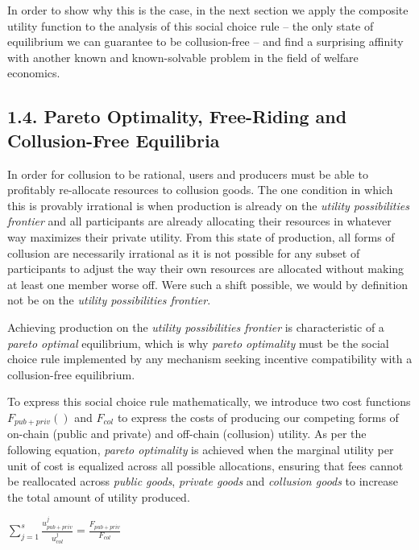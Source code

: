 \documentclass[oneside]{article}   	%
\begin{document}
In order to show why this is the case, in the next section we apply the composite utility function to the analysis of this social choice rule -- the only state of equilibrium we can guarantee to be collusion-free -- and find a surprising affinity with another known and known-solvable problem in the field of welfare economics.


\subsection*{1.4. Pareto Optimality, Free-Riding and Collusion-Free Equilibria}

In order for collusion to be rational, users and producers must be able to profitably re-allocate resources to collusion goods. The one condition in which this is provably irrational is when production is already on the \textit{utility possibilities frontier} and all participants are already allocating their resources in whatever way maximizes their private utility. From this state of production, all forms of collusion are necessarily irrational as it is not possible for any subset of participants to adjust the way their own resources are allocated without making at least one member worse off. Were such a shift possible, we would by definition not be on the \textit{utility possibilities frontier}.

Achieving production on the \textit{utility possibilities frontier} is characteristic of a \textit{pareto optimal} equilibrium, which is why \textit{pareto optimality} must be the social choice rule implemented by any mechanism seeking incentive compatibility with a collusion-free equilibrium.

To express this social choice rule mathematically, we introduce two cost functions $F_{{pub} + {priv}}()$ and $F_{col}$ to express the costs of producing our competing forms of on-chain (public and private) and off-chain (collusion) utility. As per the following equation, \textit{pareto optimality} is achieved when the marginal utility per unit of cost is equalized across all possible allocations, ensuring that fees cannot be reallocated across \textit{public goods}, \textit{private goods} and \textit{collusion goods} to increase the total amount of utility produced.

\LARGE
\begin{adjustwidth}{1.5em}{1.5em}
\begin{math}
\sum_{j=1}^{s} \frac{u_{{pub}+{priv}}^j}{u_{col}^j} = \frac{F_{{pub} + {priv}}}{F_{col}}
\end{math}
\end{adjustwidth}
\normalsize
\end{document}
